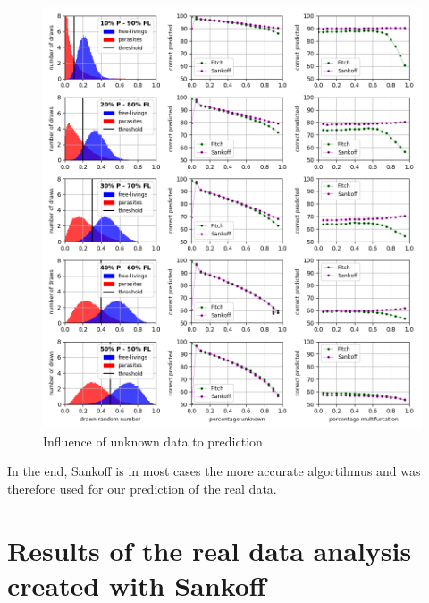     \begin{figure}
      \centering
      \includegraphics[trim = 0mm 0mm 0mm 0mm, clip, width=\textwidth]{Figures/simulation_evaluation_1.png}
      \caption{Influence of unknown data to prediction}
      \label{fig:influence of unknown data}
    \end{figure}

    In the end, Sankoff is in most cases the more accurate algortihmus and was therefore used for our 
      prediction of the real data.

  \section{Results of the real data analysis created with Sankoff}

